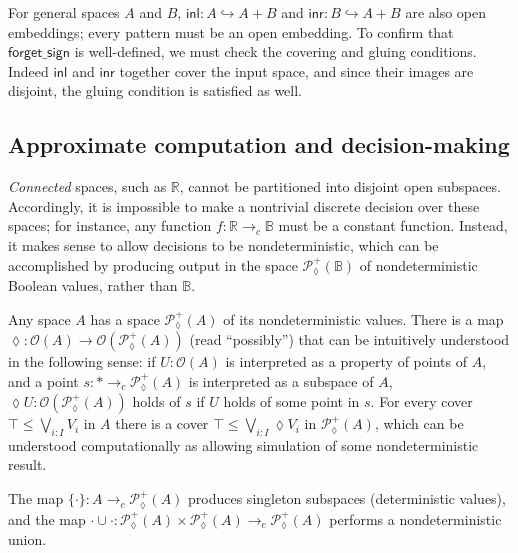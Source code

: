 \documentclass[conference]{IEEEtran}
\newcommand{\PLower}{\mathcal{P}_\lozenge}
\newcommand{\hookto}{\hookrightarrow}
\newcommand{\cto}{\to_c}
\newcommand{\R}{\mathbb{R}}
\newcommand{\One}{\ast}
\newcommand{\Open}[1]{\mathcal{O}({#1})}
\newcommand{\bool}{\mathbb{B}}
\begin{document}
For general spaces $A$ and $B$, $\mathsf{inl} : A \hookto A + B$ and $\mathsf{inr} : B \hookto A + B$ are also open embeddings; every pattern must be an open embedding. To confirm that $\mathsf{forget\_sign}$ is well-defined, we must check the covering and gluing conditions. Indeed $\mathsf{inl}$ and $\mathsf{inr}$ together cover the input space, and since their images are disjoint, the gluing condition is satisfied as well.

\subsection{Approximate computation and decision-making}
\label{s:ex:approx}

\emph{Connected} spaces, such as $\R$, cannot be partitioned into disjoint open subspaces. Accordingly, it is impossible to make a nontrivial discrete decision over these spaces; for instance, any function $f : \R \cto \bool$ must be a constant function. Instead, it makes sense to allow decisions to be nondeterministic, which can be accomplished by producing output in the space $\PLower^+(\bool)$ of nondeterministic Boolean values, rather than $\bool$.

Any space $A$ has a space $\PLower^+(A)$ of its nondeterministic values. There is a map $\lozenge : \Open{A} \to \Open{\PLower^+(A)}$ (read ``possibly'') that can be intuitively understood in the following sense: if $U : \Open{A}$ is interpreted as a property of points of $A$, and a point $s : \One \cto \PLower^+(A)$ is interpreted as a subspace of $A$, $\lozenge U : \Open{\PLower^+(A)}$ holds of $s$ if $U$ holds of some point in $s$. For every cover $\top \le \bigvee_{i : I} V_i$ in $A$ there is a cover $\top \le \bigvee_{i : I} \lozenge V_i$ in $\PLower^+(A)$, which can be understood computationally as allowing simulation of some nondeterministic result.

The map $\{ \cdot \} : A \cto \PLower^+(A)$ produces singleton subspaces (deterministic values), and the map $\cdot \cup \cdot : \PLower^+(A) \times \PLower^+(A) \cto \PLower^+(A)$ performs a nondeterministic union.
\end{document}
